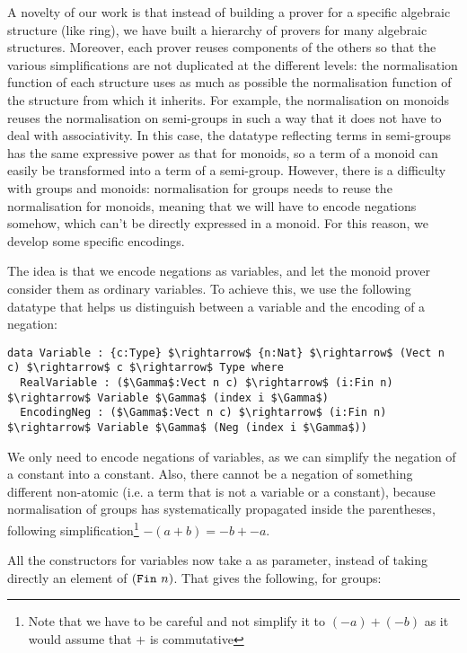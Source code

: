A novelty of our work is that instead of building a prover for a
specific algebraic structure (like ring), we have built a hierarchy of provers
for many algebraic structures. Moreover, each prover reuses components
of the others so that
the various simplifications are not duplicated at the different
levels: the normalisation function of each structure uses as much as possible
the normalisation function of the structure from which it inherits. For
example, the normalisation on monoids reuses the normalisation on semi-groups
in such a way that it does not have to deal with associativity. In this
case, the datatype reflecting terms in semi-groups has
the same expressive power as that for monoids, so a term of a monoid can easily be transformed into a term of a semi-group. However, 
there is a difficulty with
groups and monoids: normalisation for groups
needs to reuse the normalisation for monoids, meaning that
we will have to encode 
negations somehow, which can't be directly expressed in a monoid. For this
reason, we develop some specific encodings.

The idea is that we encode negations as variables, and let the
monoid prover consider them as ordinary variables. To achieve this,
we use the following datatype that helps us distinguish between a
variable and the encoding of a negation:

\begin{lstlisting}
data Variable : {c:Type} $\rightarrow$ {n:Nat} $\rightarrow$ (Vect n c) $\rightarrow$ c $\rightarrow$ Type where
  RealVariable : ($\Gamma$:Vect n c) $\rightarrow$ (i:Fin n) $\rightarrow$ Variable $\Gamma$ (index i $\Gamma$)
  EncodingNeg : ($\Gamma$:Vect n c) $\rightarrow$ (i:Fin n) $\rightarrow$ Variable $\Gamma$ (Neg (index i $\Gamma$))
\end{lstlisting}

We only need to encode negations of variables, as we can simplify 
the negation of a constant into a constant.
Also, there cannot be a negation of something
different non-atomic (i.e. a term that is not a variable or a constant), because normalisation 
of
groups has systematically propagated  inside the parentheses,
following simplification\footnote{Note that we have to be careful and not
simplify it to $(-a) + (-b)$ as it would assume that $+$ is commutative}
$-(a+b) = -b + -a$.

All the constructors for variables now take a  as parameter,
instead of taking directly an element of $(\code{Fin}\ n)$. That gives the
following, for groups:

